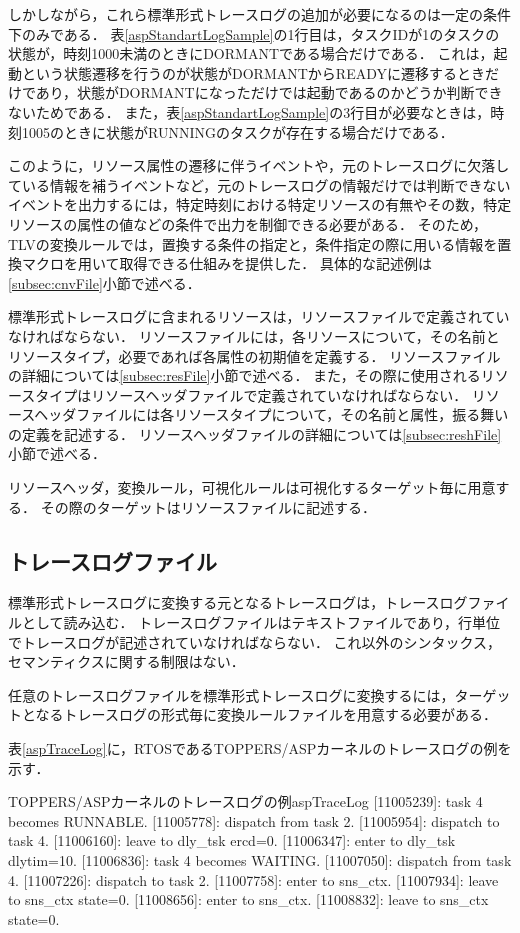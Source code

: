 しかしながら，これら標準形式トレースログの追加が必要になるのは一定の条件下のみである．
表\ref{aspStandartLogSample}の1行目は，タスクIDが1のタスクの状態が，時刻1000未満のときにDORMANTである場合だけである．
これは，起動という状態遷移を行うのが状態がDORMANTからREADYに遷移するときだけであり，状態がDORMANTになっただけでは起動であるのかどうか判断できないためである．
また，表\ref{aspStandartLogSample}の3行目が必要なときは，時刻1005のときに状態がRUNNINGのタスクが存在する場合だけである．

このように，リソース属性の遷移に伴うイベントや，元のトレースログに欠落している情報を補うイベントなど，元のトレースログの情報だけでは判断できないイベントを出力するには，特定時刻における特定リソースの有無やその数，特定リソースの属性の値などの条件で出力を制御できる必要がある．
そのため，TLVの変換ルールでは，置換する条件の指定と，条件指定の際に用いる情報を置換マクロを用いて取得できる仕組みを提供した．
具体的な記述例は\ref{subsec:cnvFile}小節で述べる．

標準形式トレースログに含まれるリソースは，リソースファイルで定義されていなければならない．
リソースファイルには，各リソースについて，その名前とリソースタイプ，必要であれば各属性の初期値を定義する．
リソースファイルの詳細については\ref{subsec:resFile}小節で述べる．
また，その際に使用されるリソースタイプはリソースヘッダファイルで定義されていなければならない．
リソースヘッダファイルには各リソースタイプについて，その名前と属性，振る舞いの定義を記述する．
リソースヘッダファイルの詳細については\ref{subsec:reshFile}小節で述べる．

リソースヘッダ，変換ルール，可視化ルールは可視化するターゲット毎に用意する．
その際のターゲットはリソースファイルに記述する．

\subsection{トレースログファイル}

標準形式トレースログに変換する元となるトレースログは，トレースログファイルとして読み込む．
トレースログファイルはテキストファイルであり，行単位でトレースログが記述されていなければならない．
これ以外のシンタックス，セマンティクスに関する制限はない．

任意のトレースログファイルを標準形式トレースログに変換するには，ターゲットとなるトレースログの形式毎に変換ルールファイルを用意する必要がある．

表\ref{aspTraceLog}に，RTOSであるTOPPERS/ASPカーネルのトレースログの例を示す．

\begin{File}{TOPPERS/ASPカーネルのトレースログの例}{aspTraceLog}
[11005239]: task 4 becomes RUNNABLE.
[11005778]: dispatch from task 2.
[11005954]: dispatch to task 4.
[11006160]: leave to dly_tsk ercd=0.
[11006347]: enter to dly_tsk dlytim=10.
[11006836]: task 4 becomes WAITING.
[11007050]: dispatch from task 4.
[11007226]: dispatch to task 2.
[11007758]: enter to sns_ctx.
[11007934]: leave to sns_ctx state=0.
[11008656]: enter to sns_ctx.
[11008832]: leave to sns_ctx state=0.
\end{File}

